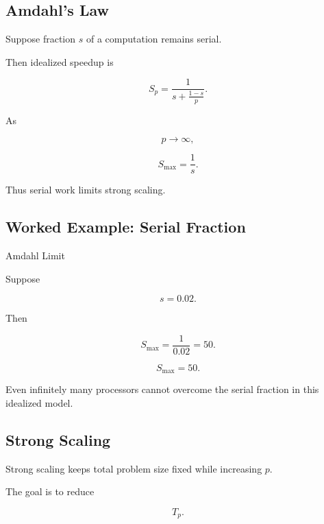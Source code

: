 \subsection{Amdahl's Law}
\label{subsec:hpmc-amdahl}

Suppose fraction \(s\) of a computation remains serial.

Then idealized speedup is

\[
\boxed{
S_p
=
\frac{
1
}{
s+\frac{1-s}{p}
}.
}
\]

As

\[
p\to\infty,
\]

\[
\boxed{
S_{\max}
=
\frac1s.
}
\]

Thus serial work limits strong scaling.

\subsection{Worked Example: Serial Fraction}
\label{subsec:worked-serial-fraction}

\begin{workedexamplebox}{Amdahl Limit}

Suppose

\[
s=0.02.
\]

Then

\[
S_{\max}
=
\frac1{0.02}
=
50.
\]

\begin{answerbox}
\[
\boxed{
S_{\max}=50.
}
\]
\end{answerbox}

Even infinitely many processors cannot overcome the serial fraction in this
idealized model.

\end{workedexamplebox}

\subsection{Strong Scaling}
\label{subsec:hpmc-strong-scaling}

Strong scaling keeps total problem size fixed while increasing \(p\).

The goal is to reduce

\[
\boxed{
T_p.
}
\]


